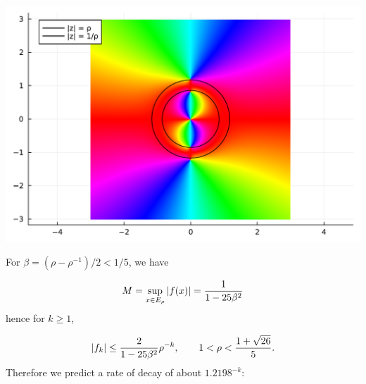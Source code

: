 \documentclass[12pt,a4paper]{article}
\begin{document}
\includegraphics[width=\linewidth]{jl_dOthw0/OP_methods_27_1.pdf}

For $\beta = (\rho - \rho^{-1})/2 < 1/5$, we have

\[
M =  \sup_{x \in  E_{\rho}} |f(x)| = {1 \over 1 - 25 \beta^2}
\]
hence for $k \geq 1$,

\[
\vert f_k \vert \leq {2 \over   1 - 25 \beta^2} \rho^{-k}, \qquad 1 < \rho <  { 1 + \sqrt{26} \over 5 }.
\]
Therefore we predict a rate of decay of about $1.2198^{-k}$:
\end{document}

